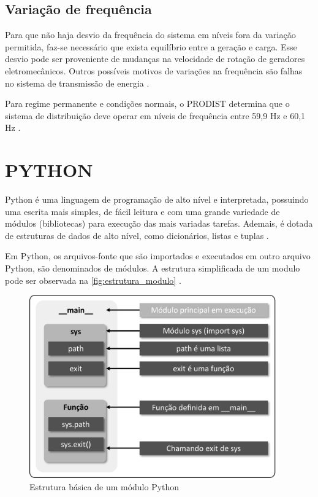 \subsection{Variação de frequência}

Para que não haja desvio da frequência do sistema em níveis fora da variação permitida, faz-se necessário que exista equilíbrio entre a geração e carga. Esse desvio pode ser proveniente de mudanças na velocidade de rotação de geradores eletromecânicos. Outros possíveis motivos de variações na frequência são falhas no sistema de transmissão de energia \cite{ref:fuchs_2015}.

Para regime permanente e condições normais, o PRODIST determina que o sistema de distribuição deve operar em níveis de frequência entre 59,9 Hz e 60,1 Hz \cite{ref:ANEEL2021}. 


\section{PYTHON}

Python é uma linguagem de programação de alto nível e interpretada, possuindo uma escrita mais simples, de fácil leitura e com uma grande variedade de módulos (bibliotecas) para execução das mais variadas tarefas. Ademais, é dotada de estruturas de dados de alto nível, como dicionários, listas e tuplas \cite{ref:borges_2014}.

Em Python, os arquivos-fonte que são importados e executados em outro arquivo Python, são denominados de módulos. A estrutura simplificada de um modulo pode ser observada na \autoref{fig:estrutura_modulo} \cite{ref:borges_2014}.

\begin{figure}[H]
	\centering
	\caption{Estrutura básica de um módulo Python}
	\label{fig:estrutura_modulo}
	\includegraphics[width=10.8cm]{illustrations/figures/estrutura_modulo.pdf}
\end{figure}

